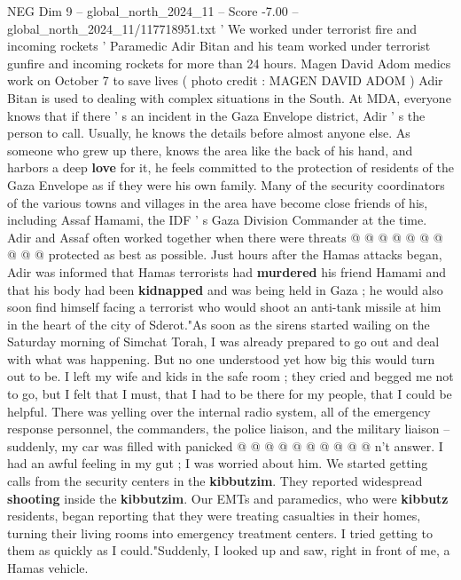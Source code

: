\begin{textsample}{NEG Dim 9 – global\_north\_2024\_11 – Score -7.00 – global\_north\_2024\_11/117718951.txt}  \label{ex:f9_neg_203}
' We worked under terrorist fire and incoming rockets ' Paramedic Adir Bitan and his team worked under terrorist gunfire and incoming rockets for more than 24 hours.
Magen David Adom medics work on October 7 to save lives ( photo credit : MAGEN DAVID ADOM ) Adir Bitan is used to dealing with complex situations in the South.
At MDA, everyone knows that if there ' s an incident in the Gaza Envelope district, Adir ' s the person to call.
Usually, he knows the details before almost anyone else.
As someone who grew up there, knows the area like the back of his hand, and harbors a deep \textbf{love} for it, he feels committed to the protection of residents of the Gaza Envelope as if they were his own family.
Many of the security coordinators of the various towns and villages in the area have become close friends of his, including Assaf Hamami, the IDF ' s Gaza Division Commander at the time.
Adir and Assaf often worked together when there were threats @ @ @ @ @ @ @ @ @ @ protected as best as possible.
Just hours after the Hamas attacks began, Adir was informed that Hamas terrorists had \textbf{murdered} his friend Hamami and that his body had been \textbf{kidnapped} and was being held in Gaza ; he would also soon find himself facing a terrorist who would shoot an anti-tank missile at him in the heart of the city of Sderot."As soon as the sirens started wailing on the Saturday morning of Simchat Torah, I was already prepared to go out and deal with what was happening.
But no one understood yet how big this would turn out to be.
I left my wife and kids in the safe room ; they cried and begged me not to go, but I felt that I must, that I had to be there for my people, that I could be helpful.
There was yelling over the internal radio system, all of the emergency response personnel, the commanders, the police liaison, and the military liaison -- suddenly, my car was filled with panicked @ @ @ @ @ @ @ @ @ @ n't answer.
I had an awful feeling in my gut ; I was worried about him.
We started getting calls from the security centers in the \textbf{kibbutzim}.
They reported widespread \textbf{shooting} inside the \textbf{kibbutzim}.
Our EMTs and paramedics, who were \textbf{kibbutz} residents, began reporting that they were treating casualties in their homes, turning their living rooms into emergency treatment centers.
I tried getting to them as quickly as I could."Suddenly, I looked up and saw, right in front of me, a Hamas vehicle.

\end{textsample}
